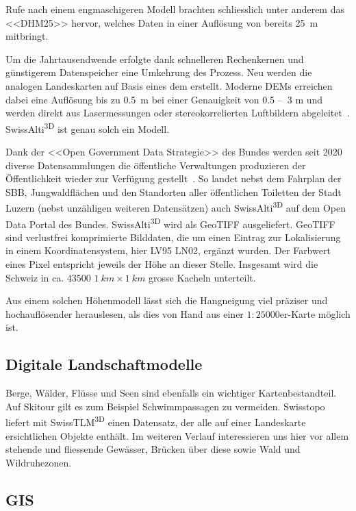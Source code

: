 Rufe nach einem engmaschigeren Modell brachten schliesslich unter anderem das <<DHM25>> hervor, welches Daten in einer Auflösung von bereits \qty{25}{m} mitbringt.~\cite{swisstopohistdem}

Um die Jahrtausendwende erfolgte dank schnelleren Rechenkernen und günstigerem Datenspeicher eine Umkehrung des Prozess. Neu werden die analogen Landeskarten auf Basis eines \acrshort{dem} erstellt. Moderne DEMs erreichen dabei eine Auflösung bis zu \qty{0.5}{m} bei einer Genauigkeit von 0.5 --~3 \unit{m} und werden direkt aus Lasermessungen oder stereokorrelierten Luftbildern abgeleitet~\cite{alti3dprod}. SwissAlti\textsuperscript{3D} ist genau solch ein Modell.

Dank der <<Open Government Data Strategie>> des Bundes werden seit 2020 diverse Datensammlungen die öffentliche Verwaltungen produzieren der Öffentlichkeit wieder zur Verfügung gestellt~\cite{opendataswiss}.
So landet nebst dem Fahrplan der SBB, Jungwaldflächen und den Standorten aller öffentlichen Toiletten der Stadt Luzern (nebst unzähligen weiteren Datensätzen) auch  SwissAlti\textsuperscript{3D} auf dem Open Data Portal des Bundes.
SwissAlti\textsuperscript{3D} wird als GeoTIFF ausgeliefert. GeoTIFF sind verlustfrei komprimierte Bilddaten, die um einen Eintrag zur Lokalisierung in einem Koordinatensystem, hier LV95 LN02, ergänzt wurden. Der Farbwert eines Pixel entspricht jeweils der Höhe an dieser Stelle. Insgesamt wird die Schweiz in ca. $43500$ $\qty{1}{km} \times \qty{1}{km}$ grosse Kacheln unterteilt.~\cite{alti3dprod} 

Aus einem solchen Höhenmodell lässt sich die Hangneigung viel präziser und hochauflösender herauslesen, als dies von Hand aus einer $1:25000$er-Karte möglich ist.

\subsection{Digitale Landschaftmodelle}

Berge, Wälder, Flüsse und Seen sind ebenfalls ein wichtiger Kartenbestandteil. Auf Skitour gilt es zum Beispiel Schwimmpassagen zu vermeiden. Swisstopo liefert mit SwissTLM\textsuperscript{3D} einen Datensatz, der alle auf einer Landeskarte ersichtlichen Objekte enthält. Im weiteren Verlauf interessieren uns hier vor allem stehende und fliessende Gewässer, Brücken über diese sowie Wald und Wildruhezonen.

\subsection{GIS}\label{sec:gis}

